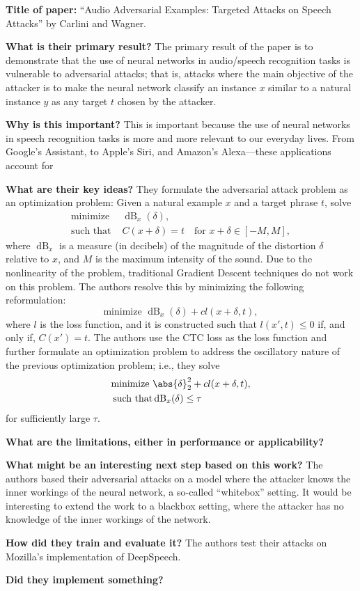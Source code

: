 \noindent \textbf{Title of paper:} ``Audio Adversarial Examples: Targeted
Attacks on Speech Attacks'' by Carlini and Wagner.

\noindent\textbf{What is their primary result?} The primary result of the
paper is to demonstrate that the use of neural networks in audio/speech
recognition tasks is vulnerable to adversarial attacks; that is, attacks where
the main objective of the attacker is to make the neural network classify an
instance $x$ similar to a natural instance $y$ as any target $t$ chosen by the
attacker.

\noindent\textbf{Why is this important?} This is important because the use of
neural networks in speech recognition tasks is more and more relevant to our
everyday lives. From Google's Assistant, to Apple's Siri, and Amazon's
Alexa---these applications account for

\noindent\textbf{What are their key ideas?} They formulate the adversarial
attack problem as an optimization problem: Given a natural example $x$ and a
target phrase $t$, solve
\[
  \begin{aligned}
    \text{minimize }
    &\operatorname{dB}_x(\delta),\\
    \text{such that }&C(x+\delta)=t\quad \text{for } x+\delta\in [-M,M],
  \end{aligned}
\]
where $\operatorname{dB}_x$ is a measure (in decibels) of the magnitude of the
distortion $\delta$ relative to $x$, and $M$ is the maximum intensity of the
sound. Due to the nonlinearity of the problem, traditional Gradient Descent
techniques do not work on this problem. The authors resolve this by minimizing
the following reformulation:
\[
  \text{minimize }\operatorname{dB}_x(\delta)+cl(x+\delta,t),
\]
where $l$ is the loss function, and it is constructed such that $l(x',t)\leq 0$
if, and only if, $C(x')=t$. The authors use the CTC loss as the loss function
and further formulate an optimization problem to address the oscillatory nature
of the previous optimization problem; i.e., they solve
\begin{align*}
  \text{minimize }  &\abs{\delta}_2^2+cl(x+\delta,t),\\
  \text{such that}&\operatorname{dB}_x(\delta)\leq\tau
\end{align*}
for sufficiently large $\tau$.

\noindent\textbf{What are the limitations, either in performance or
  applicability?} 

\noindent\textbf{What might be an interesting next step based on this work?} The
authors based their adversarial attacks on a model where the attacker knows the
inner workings of the neural network, a so-called ``whitebox'' setting. It would
be interesting to extend the work to a blackbox setting, where the attacker has
no knowledge of the inner workings of the network.


\noindent\textbf{How did they train and evaluate it?} The authors test their
attacks on Mozilla's implementation of DeepSpeech.

\noindent\textbf{Did they implement something?}

